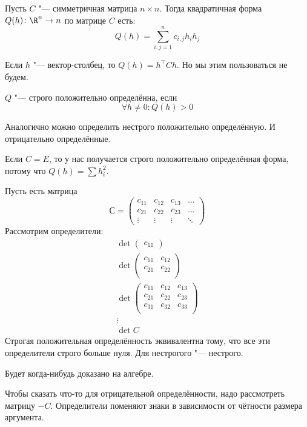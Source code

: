 \begin{Def}
	Пусть $C$ "--- симметричная матрица $n \times n$.
	Тогда квадратичная форма $Q(h) \colon \R^n \to n$ по матрице $C$ есть:
	\[ Q(h) = \sum_{i,j=1}^n c_{i,j} h_i h_j \]
\end{Def}
\begin{Rem}
	Если $h$ "--- вектор-столбец, то $Q(h) = h^\top C h$.
	Но мы этим пользоваться не будем.
\end{Rem}
\begin{Def}
	$Q$ "--- строго положительно определённа, если
	\[ \forall h \neq 0 \colon Q(h) > 0\]
\end{Def}
\begin{Rem}
	Аналогично можно определить нестрого положительно определённую.
	И отрицательно определённые.
\end{Rem}
\begin{exmp}
	Если $C=E$, то у нас получается строго положительно определённая форма,
	потому что $Q(h) = \sum h_i^2$.
\end{exmp}

\begin{theorem}
	Пусть есть матрица
	\[
	С=
	\begin{pmatrix}
		c_{11} & c_{12} & c_{13} & \dots \\
		c_{21} & c_{22} & c_{23} & \dots \\
		\vdots & \vdots & \vdots & \ddots
	\end{pmatrix}
	\]
	Рассмотрим определители:
	\begin{gather*}
	\det
		\begin{pmatrix}
			c_{11}
		\end{pmatrix} \\
	\det
		\begin{pmatrix}
			c_{11} & c_{12} \\
			c_{21} & c_{22} \\
		\end{pmatrix} \\
	\det
		\begin{pmatrix}
			c_{11} & c_{12} & c_{13} \\
			c_{21} & c_{22} & c_{23} \\
			c_{31} & c_{32} & c_{33} \\
		\end{pmatrix} \\
	\vdots \\
	\det C
	\end{gather*}
	Строгая положительная определённость эквивалентна тому, что
	все эти определители строго больше нуля.
	Для нестрогого "--- нестрого.
\end{theorem}
\begin{Rem}
	Будет когда-нибудь доказано на алгебре.
\end{Rem}
\begin{Rem}
	Чтобы сказать что-то для отрицательной определённости, надо рассмотреть матрицу $-C$.
	Определители поменяют знаки в зависимости от чётности размера аргумента.
\end{Rem}

